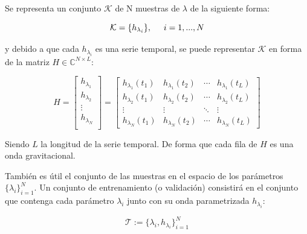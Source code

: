 Se representa un conjunto \( \mathcal{K} \) de N muestras de $\lambda$ de la siguiente forma:

\[ \mathcal{K}  = \{h_{\lambda_i}\}, \hspace{5mm} i = 1, ..., N\]

y debido a que cada $h_{\lambda_i}$ es una serie temporal, se puede representar $\mathcal{K}$ en forma de la matriz $H \in \mathbb{C}^{N\times L}$:

\[
H = 
\begin{bmatrix}
h_{\lambda_1} \\
h_{\lambda_2} \\
 \vdots \\
 h_{\lambda_N} \\
\end{bmatrix}
= 
\begin{bmatrix}
h_{\lambda_1}(t_1) & h_{\lambda_1}(t_2)  & \cdots & h_{\lambda_1}(t_L)\\
 h_{\lambda_2}(t_1) & h_{\lambda_2}(t_2)  & \cdots & h_{\lambda_2}(t_L)\\
 \vdots & \vdots & \ddots &  \vdots \\
h_{\lambda_N}(t_1) & h_{\lambda_N}(t_2)  & \cdots & h_{\lambda_N}(t_L)
\end{bmatrix}
\]

Siendo $L$ la longitud de la serie temporal. De forma que cada fila de $H$ es una onda gravitacional.

También es útil el conjunto de las muestras en el espacio de los parámetros
$\{ \lambda_i \}_{i=1}^N$. 
Un conjunto de entrenamiento (o validación) consistirá en el conjunto que contenga cada parámetro $\lambda_i$ junto con su onda parametrizada $h_{\lambda_i}$:

\[
\mathcal{T} := \{ \lambda_i, h_{\lambda_i} \}_{i=1}^N
\]



